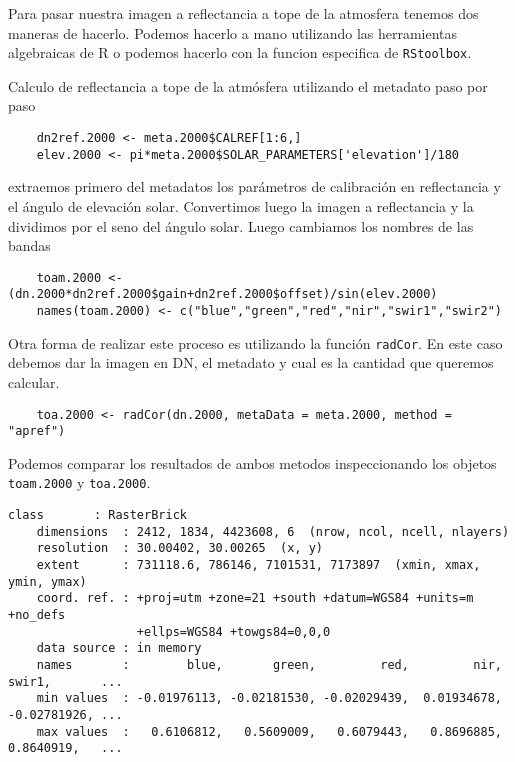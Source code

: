 Para pasar nuestra imagen a reflectancia a tope
de la atmosfera tenemos dos maneras de hacerlo. Podemos hacerlo a mano
utilizando las herramientas algebraicas de R o podemos hacerlo con la funcion
especifica de \texttt{RStoolbox}.

\begin{exa}
    Calculo de reflectancia a tope de la atm\'osfera
    utilizando el metadato paso por paso

    \begin{lstlisting}
    dn2ref.2000 <- meta.2000$CALREF[1:6,]
    elev.2000 <- pi*meta.2000$SOLAR_PARAMETERS['elevation']/180
    \end{lstlisting}
    extraemos primero del metadatos los par\'ametros de calibraci\'on en
    reflectancia y el \'angulo de elevaci\'on solar. Convertimos luego la imagen
    a reflectancia y la dividimos por el seno del \'angulo solar.
    Luego cambiamos los nombres de las bandas

    \begin{lstlisting}
    toam.2000 <- (dn.2000*dn2ref.2000$gain+dn2ref.2000$offset)/sin(elev.2000)
    names(toam.2000) <- c("blue","green","red","nir","swir1","swir2")
    \end{lstlisting}

    Otra forma de realizar este proceso es utilizando la funci\'on
    \texttt{radCor}. En este caso debemos dar la imagen en DN, el metadato y
    cual es la cantidad que queremos calcular.

    \begin{lstlisting}
    toa.2000 <- radCor(dn.2000, metaData = meta.2000, method = "apref")
    \end{lstlisting}

    Podemos comparar los resultados de ambos metodos inspeccionando los objetos
    \texttt{toam.2000} y \texttt{toa.2000}.
    \begin{Verbatim}[fontsize=\small]
    class       : RasterBrick
    dimensions  : 2412, 1834, 4423608, 6  (nrow, ncol, ncell, nlayers)
    resolution  : 30.00402, 30.00265  (x, y)
    extent      : 731118.6, 786146, 7101531, 7173897  (xmin, xmax, ymin, ymax)
    coord. ref. : +proj=utm +zone=21 +south +datum=WGS84 +units=m +no_defs
                  +ellps=WGS84 +towgs84=0,0,0
    data source : in memory
    names       :        blue,       green,         red,         nir,    swir1,       ...
    min values  : -0.01976113, -0.02181530, -0.02029439,  0.01934678,    -0.02781926, ...
    max values  :   0.6106812,   0.5609009,   0.6079443,   0.8696885,    0.8640919,   ...
    \end{Verbatim}


\end{exa}
